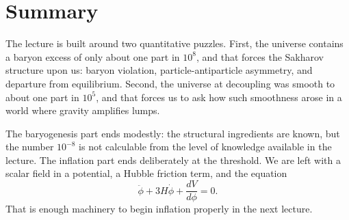 \section{Summary}

The lecture is built around two quantitative puzzles. First, the universe contains a baryon excess of only about one part in \(10^8\), and that forces the Sakharov structure upon us: baryon violation, particle-antiparticle asymmetry, and departure from equilibrium. Second, the universe at decoupling was smooth to about one part in \(10^5\), and that forces us to ask how such smoothness arose in a world where gravity amplifies lumps.

The baryogenesis part ends modestly: the structural ingredients are known, but the number \(10^{-8}\) is not calculable from the level of knowledge available in the lecture. The inflation part ends deliberately at the threshold. We are left with a scalar field in a potential, a Hubble friction term, and the equation
\[
\ddot{\phi}+3H\dot{\phi}+\frac{dV}{d\phi}=0.
\]
That is enough machinery to begin inflation properly in the next lecture.